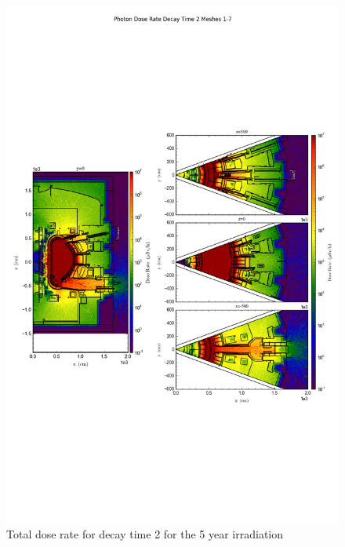 \documentclass[12pt]{article}
\begin{document}
\begin{figure}[ht!]
\centering
\includegraphics[trim={0cm 8cm, 0cm 8cm},clip,scale=0.75]{../plots/final_model_with_b4c/5year/Photon_Dose_Rate_Decay_Time_2_Meshes_1-7.png}
\caption{Total dose rate for decay time 2 for the 5 year irradiation}
\label{fig:photons_5y_dc2_b4c_dose}
\end{figure}
\end{document}
